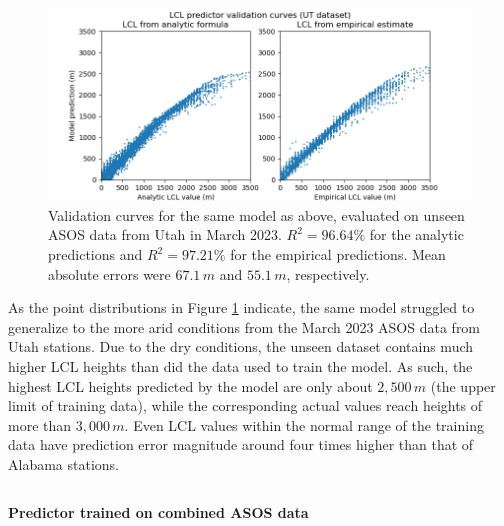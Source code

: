 \documentclass[11pt]{article}
\begin{document}
\begin{figure}[h!]
    \centering

    \includegraphics[width=.6\paperwidth]{figs/val_ff-rand-014_ut.png}

    \caption{Validation curves for the same model as above, evaluated on unseen ASOS data from Utah in March 2023. $R^2=96.64\%$ for the analytic predictions and $R^2=97.21\%$ for the empirical predictions. Mean absolute errors were $67.1\,\si{m}$ and $55.1\,\si{m}$, respectively.}
    \label{f2}
\end{figure}

\newpage

As the point distributions in Figure \ref{f2} indicate, the same model struggled to generalize to the more arid conditions from the March 2023 ASOS data from Utah stations. Due to the dry conditions, the unseen dataset contains much higher LCL heights than did the data used to train the model. As such, the highest LCL heights predicted by the model are only about $2,500\,\si{m}$ (the upper limit of training data), while the corresponding actual values reach heights of more than $3,000\,\si{m}$. Even LCL values within the normal range of the training data have prediction error magnitude around four times higher than that of Alabama stations.

\begin{figure}[h!]\label{q1q2}
    \centering
    \begin{tabular}{ c c c | c}
    \end{tabular}
\end{figure}

\vspace{-1em}
\noindent
{\Large\textbf{Predictor trained on combined ASOS data}}
\end{document}
